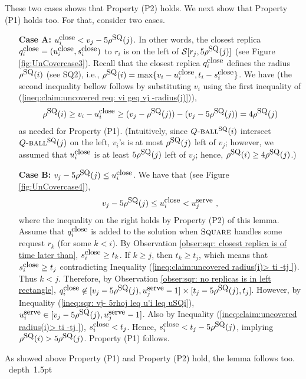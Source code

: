 \documentclass[11pt]{article}
\def\blackslug{\hbox{\hskip 1pt \vrule width 4pt height 8pt
    depth 1.5pt \hskip 1pt}}
\def\QED{\quad\blackslug\lower 8.5pt\null\par}
\newcommand{\calS}{\mathcal{S}}
\newcommand{\Square}[0]{\mbox{\sc Square}}
\newcommand{\uSQ}{u^{\mbox{\small\upshape serve}}}
\newcommand{\qclose}{q^{\mbox{\small\upshape close}}}
\newcommand{\uclose}{u^{\mbox{\small\upshape close}}}
\newcommand{\sclose}{s^{\mbox{\small\upshape close}}}
\newcommand{\rhoSQ}[0]{\rho^{\mbox{\small\upshape SQ}}}
\newcommand{\seq}[1]{\calS[#1]}
\newcommand{\SQball}[0]{Q{\mbox{\sc -ball}}^{\mbox{\sc sq}}}
\begin{document}
\noindent
These two cases shows that Property (P2) holds.
We next show that Property (P1) holds too.
For that, consider two cases.




\begin{itemize}

\item [{\bf Case A:}] $\uclose_i < v_j-5\rhoSQ(j)$.
In other words, the closest replica $\qclose_i=(\uclose_i,\sclose_i)$ to $r_i$ is on the left of $\seq{r_j,5\rhoSQ(j)}$
(see Figure \ref{fig:UnCovercase3}).
Recall that the closest replica $\qclose_i$ defines the radius $\rhoSQ(i)$ (see SQ2), i.e.,
$\rhoSQ(i)=\max\{v_i-\uclose_i, t_i-\sclose_i\}$.
We have
(the second inequality bellow follows by substituting $v_i$ using the first inequality of (\ref{ineq:claim:uncovered req: vi geq vj -radius(j)})),
\begin{eqnarray*}
\rhoSQ(i) \geq v_i-\uclose_i\geq (v_j-\rhoSQ(j)) - (v_j-5\rhoSQ(j))=4\rhoSQ(j)
\end{eqnarray*}
as needed for Property (P1).
(Intuitively, since $\SQball(i)$ intersect $\SQball(j)$ on the left, $v_i$'s is at most $\rhoSQ(j)$ left of $v_j$;
however, we assumed that $\uclose_i$ is at least $5\rhoSQ(j)$ left of $v_j$;
hence, $\rhoSQ(i)\geq 4\rhoSQ(j)$.)




\item [{\bf Case B:}] $v_j-5\rhoSQ(j) \leq \uclose_i$.
We have that (see Figure \ref{fig:UnCovercase4}),
\begin{eqnarray}
v_j-5\rhoSQ(j) \leq \uclose_i < \uSQ_j~,
\label{ineq:sqr: vj- 5rhoj leq u'i leq uSQi}
\end{eqnarray}
where the inequality on the right holds by Property (P2) of this lemma.
Assume that $\qclose_i$ is added to the solution when $\Square$ handles some request $r_k$ (for some $k<i$).
By Observation \ref{obser:sqr: closest replica is of time later than}, $\sclose_i \geq t_k$.
If $k\geq j$, then $t_k \geq t_j$, which means that $\sclose_i \geq   t_j$
contradicting Inequality (\ref{ineq:claim:uncovered radius(i)> ti -tj }).
Thus $k<j$.
Therefore, by Observation \ref{obser:sqr: no replicas is in left rectangle},
$\qclose_i\not\in[v_j-5\rhoSQ(j),\uSQ_{j}-1]\times[t_j-5\rhoSQ(j),t_j]$.
However, by Inequality (\ref{ineq:sqr: vj- 5rhoj leq u'i leq uSQi}),
$\uSQ_i\in[v_j-5\rhoSQ(j),\uSQ_j-1]$.
Also by Inequality (\ref{ineq:claim:uncovered radius(i)> ti -tj }), $\sclose_i<t_j$.
Hence, $\sclose_i<t_j-5\rhoSQ(j)$,
implying $\rhoSQ(i)>5\rhoSQ(j)$. Property (P1) follows.


\end{itemize}
As showed above Property (P1) and Property (P2) hold, the lemma follows too.
\QED
\end{document}
